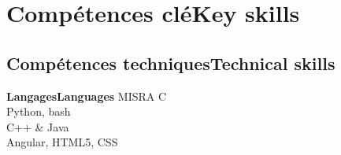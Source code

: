 \vspace{-1.3cm}

\ifnativelang
\newcommand{\CVheader}{6 ann\'ees d'exp\'erience en syst\`emes embarqu\'es critiques et r\'eseaux.}%
\else
\newcommand{\CVheader}{6+ years of experience in Real-Time systems, embedded linux and networking.\\
Experience in project steering and team management.}
\fi


\section{\ifnativelang Comp\'etences cl\'e\else Key skills\fi}

\ifaddmngt
\subsection{\ifnativelang Comp\'etences techniques\else Technical skills\fi}
\fi

{\ifnativelang\textbf{Langages}\else \textbf{Languages}\fi}{
 MISRA C \\%
 Python, bash\\
 C++ \& Java \\
 Angular, HTML5, CSS
}

